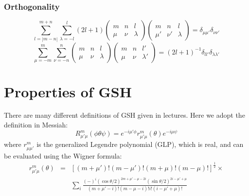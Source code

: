 \subsubsection*{Orthogonality}

\begin{equation}
\sum_{l=\left|m-n\right|}^{m+n}\sum_{\lambda=-l}^{l}\left(2l+1\right)\left(\begin{array}{ccc}
m & n & l\\
\mu & \nu & \lambda
\end{array}\right)\left(\begin{array}{ccc}
m & n & l\\
\mu' & \nu' & \lambda
\end{array}\right)=\delta_{\mu\mu'}\delta_{\nu\nu'}\label{eq:3j-orthogonality}
\end{equation}
\begin{equation}
\sum_{\mu=-m}^{m}\sum_{\nu=-n}^{n}\left(\begin{array}{ccc}
m & n & l\\
\mu & \nu & \lambda
\end{array}\right)\left(\begin{array}{ccc}
m & n & l'\\
\mu & \nu & \lambda'
\end{array}\right)=\left(2l+1\right)^{-1}\delta_{ll'}\delta_{\lambda\lambda'}
\end{equation}


\section{Properties of GSH}

There are many different definitions of GSH given in lectures. Here
we adopt the definition in Messiah:
\begin{equation}
R_{\mu'\mu}^{m}(\phi\theta\psi)=e^{-i\mu'\phi}r_{\mu'\mu}^{m}(\theta)e^{-i\mu\psi}\label{eq:GSH-def}
\end{equation}
where $r_{\mu\mu'}^{m}$ is the generalized Legendre polynomial (GLP),
which is real, and can be evaluated using the Wigner formula:
\begin{eqnarray}
r_{\mu'\mu}^{m}(\theta) & = & \left[\left(m+\mu'\right)!\left(m-\mu'\right)!\left(m+\mu\right)!\left(m-\mu\right)!\right]^{\frac{1}{2}}\times\nonumber \\
 &  & \sum_{i}\frac{\left(-\right)^{i}\left(\cos\theta/2\right)^{2m+\mu'-\mu-2i}\left(\sin\theta/2\right)^{2i-\mu'+\mu}}{\left(m+\mu'-i\right)!\left(m-\mu-i\right)!i!\left(i-\mu'+\mu\right)!}
\end{eqnarray}


